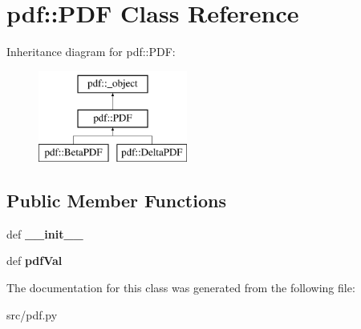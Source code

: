 \hypertarget{classpdf_1_1PDF}{
\section{pdf::PDF Class Reference}
\label{dd/d66/classpdf_1_1PDF}
}
Inheritance diagram for pdf::PDF:\begin{figure}[H]
\begin{center}
\leavevmode
\includegraphics[height=3cm]{dd/d66/classpdf_1_1PDF}
\end{center}
\end{figure}
\subsection*{Public Member Functions}
\begin{DoxyCompactItemize}
\item 
\hypertarget{classpdf_1_1PDF_ad3afb94bbbcb72475c89d7bb3f946da2}{
def {\bfseries \_\-\_\-init\_\-\_\-}}
\label{dd/d66/classpdf_1_1PDF_ad3afb94bbbcb72475c89d7bb3f946da2}

\item 
\hypertarget{classpdf_1_1PDF_a44e17a10e5b431ab10ed1f5741d05e30}{
def {\bfseries pdfVal}}
\label{dd/d66/classpdf_1_1PDF_a44e17a10e5b431ab10ed1f5741d05e30}

\end{DoxyCompactItemize}


The documentation for this class was generated from the following file:\begin{DoxyCompactItemize}
\item 
src/pdf.py\end{DoxyCompactItemize}
